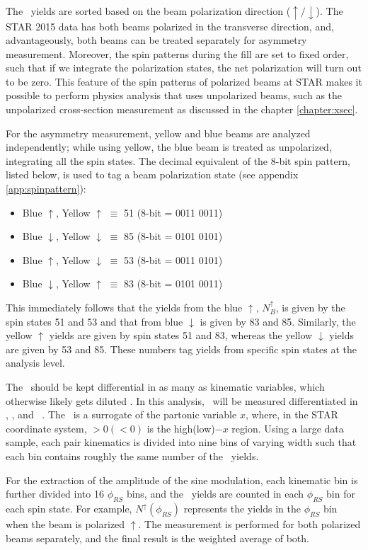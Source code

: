 The \pip\ yields are sorted based on the beam polarization direction ($\uparrow/\downarrow$). The STAR 2015 data has both beams polarized in the transverse direction, and, advantageously, both beams can be treated separately for asymmetry measurement. Moreover, the spin patterns during the fill are set to fixed order, such that if we integrate the polarization states, the net polarization will turn out to be zero. This feature of the spin patterns of polarized beams at STAR makes it possible to perform physics analysis that uses unpolarized beams, such as the unpolarized cross-section measurement as discussed in the chapter \ref{chapter:xsec}. 

For the asymmetry measurement, yellow and blue beams are analyzed independently; while using yellow, the blue beam is treated as unpolarized, integrating all the spin states.  The decimal equivalent of the 8-bit spin pattern, listed below, is used to tag a beam polarization state (see appendix \ref{app:spinpattern}):
\begin{itemize}
    \item Blue $\uparrow$, Yellow $\uparrow$ $\equiv$ 51 (8-bit = 0011 0011)
    \item Blue $\downarrow$, Yellow $\downarrow$ $\equiv$ 85 (8-bit = 0101 0101)
    \item Blue $\uparrow$, Yellow $\downarrow$ $\equiv$ 53 (8-bit = 0011 0101)
    \item Blue $\downarrow$, Yellow $\uparrow$ $\equiv$ 83 (8-bit = 0101 0011)
\end{itemize}
This immediately follows that the \dipion yields from the blue $\uparrow$, $N^\uparrow_B$, is given by the spin states 51 and 53 and that from blue $\downarrow$ is given by 83 and 85. Similarly, the yellow $\uparrow$ yields are given by spin states 51 and 83, whereas the yellow $\downarrow$ yields are given by 53 and 85. These numbers tag yields from specific spin states at the analysis level. 

The \aut\ should be kept differential in as many as kinematic variables, which otherwise likely gets diluted \cite{Jaffe:1997}. In this analysis, \aut\ will be measured differentiated in \minv, \ptp, and \etap\ . The \etap\ is a surrogate of the partonic variable $x$, where, in the STAR coordinate system, \etap $>0 (<0)$ is the high(low)$-x$ region. Using a large data sample, each pair kinematics is divided into nine bins of varying width such that each bin contains roughly the same number of the \pip\ yields.

For the extraction of the amplitude of the sine modulation, each kinematic bin is further divided into 16 $\phi_{RS}$ bins, and  the \pip\ yields are counted in each $\phi_{RS}$ bin for each spin state. For example, $N^\uparrow (\phi_{RS})$ represents the yields in the $\phi_{RS}$ bin when the beam is polarized $\uparrow$. The measurement is performed for both polarized beams separately, and the final result is the weighted average of both. 

